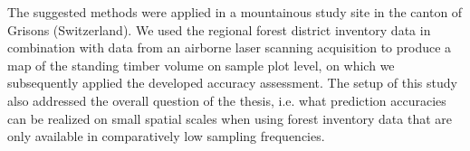 The suggested methods were applied in a mountainous study site in the canton of Grisons (Switzerland). We used the regional forest district inventory data in combination with data from an airborne laser scanning acquisition to produce a map of the standing timber volume on sample plot level, on which we subsequently applied the developed accuracy assessment. The setup of this study also addressed the overall question of the thesis, i.e. what prediction accuracies can be realized on small spatial scales when using forest inventory data that are only available in comparatively low sampling frequencies.


